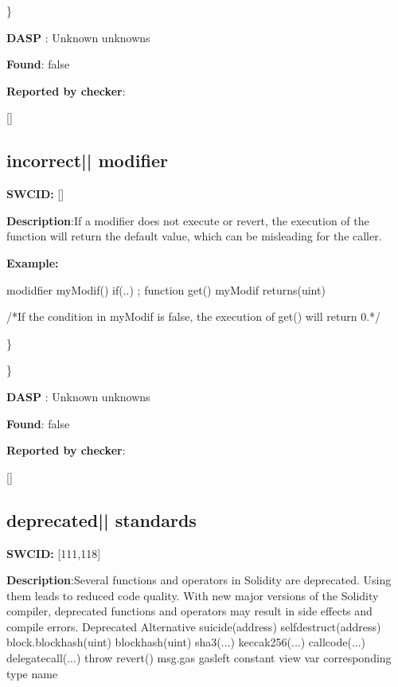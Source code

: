 \documentclass{article}
\begin{document}
\} 

\textbf{DASP} : Unknown unknowns

\textbf{Found}: false

\textbf{Reported by checker}: 
\begin{ffcode} 

[]
\end{ffcode} 
\subsection{incorrect{|\textunderscore| }modifier} 
\textbf{SWC{\textunderscore }ID:} []

\textbf{Description}:If a modifier does not execute \textunderscore  or revert, the execution of the function will return the default value, which can be misleading for the caller.


\textbf{Example:} 
\begin{ffcode} 

modidfier myModif(){
    if(..){
      \textunderscore ;
    }
}
function get() myModif returns(uint){}

 /*If the condition in myModif is false, the execution of get() will return 0.*/ 

\end{ffcode} 
\} 

\} 

\textbf{DASP} : Unknown unknowns

\textbf{Found}: false

\textbf{Reported by checker}: 
\begin{ffcode} 

[]
\end{ffcode} 
\subsection{deprecated{|\textunderscore| }standards} 
\textbf{SWC{\textunderscore }ID:} [111,118]

\textbf{Description}:Several functions and operators in Solidity are deprecated. Using them leads to reduced code quality. With new major versions of the Solidity compiler, deprecated functions and operators may result in side effects and compile errors.
  Deprecated              Alternative
  suicide(address)        selfdestruct(address)
  block.blockhash(uint)   blockhash(uint)
  sha3(...)               keccak256(...)
  callcode(...)           delegatecall(...)
  throw                   revert()
  msg.gas                 gasleft
  constant                view
  var                     corresponding type name
\end{document}

